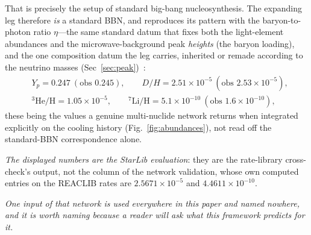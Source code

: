 \documentclass[11pt,a4paper]{article}
\theoremstyle{plain}
\theoremstyle{definition}
\theoremstyle{remark}
\begin{document}
That is precisely the setup of standard big-bang nucleosynthesis. The
expanding leg therefore \emph{is} a standard BBN, and reproduces its pattern with the
baryon-to-photon ratio $\eta$---the same standard datum that fixes both the light-element
abundances and the microwave-background peak \emph{heights} (the baryon loading), and the one composition
datum the leg carries, inherited or remade according to the neutrino masses
(Sec~\ref{sec:peak})~\cite{JanzenCRcosmology}:
\begin{equation}
\begin{aligned}
&Y_p = 0.247\ (\text{obs }0.245),\qquad
D/H = 2.51\times10^{-5}\ (\text{obs }2.53\times10^{-5}),\\
&{}^{3}\mathrm{He}/\mathrm{H}=1.05\times10^{-5},\qquad
{}^{7}\mathrm{Li}/\mathrm{H}=5.1\times10^{-10}\ (\text{obs }1.6\times10^{-10}),
\end{aligned}
\end{equation}
these being the values a genuine multi-nuclide network returns when integrated explicitly on the
cooling history (Fig.~\ref{fig:abundances}), not read off the standard-BBN correspondence alone. 

\emph{The displayed numbers are the StarLib evaluation}: they are the rate-library cross-check's output, not the column of the network validation, whose own computed entries on the REACLIB rates are $2.5671\times10^{-5}$ and $4.4611\times10^{-10}$. 

\emph{One input of that network is used everywhere in this paper and named nowhere, and it is worth naming because a reader will ask what this framework predicts for it.} 
\end{document}
